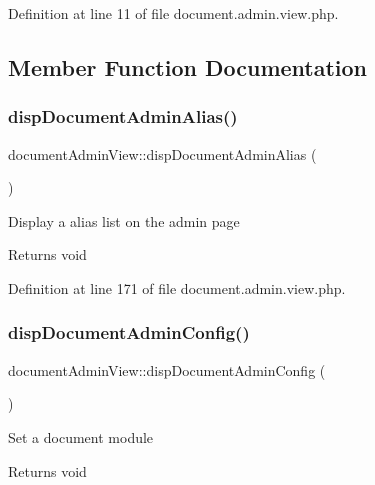 Definition at line 11 of file document.\+admin.\+view.\+php.



\subsection{Member Function Documentation}
\hypertarget{classdocumentAdminView_a7f9210670150395b7ef8c6209ce0ac53}{}\label{classdocumentAdminView_a7f9210670150395b7ef8c6209ce0ac53} 
\subsubsection{\texorpdfstring{disp\+Document\+Admin\+Alias()}{dispDocumentAdminAlias()}}
{\footnotesize\ttfamily document\+Admin\+View\+::disp\+Document\+Admin\+Alias (\begin{DoxyParamCaption}{ }\end{DoxyParamCaption})}

Display a alias list on the admin page \begin{DoxyReturn}{Returns}
void 
\end{DoxyReturn}


Definition at line 171 of file document.\+admin.\+view.\+php.

\hypertarget{classdocumentAdminView_a4b41049c99341fbb4a782da55d3737e5}{}\label{classdocumentAdminView_a4b41049c99341fbb4a782da55d3737e5} 
\subsubsection{\texorpdfstring{disp\+Document\+Admin\+Config()}{dispDocumentAdminConfig()}}
{\footnotesize\ttfamily document\+Admin\+View\+::disp\+Document\+Admin\+Config (\begin{DoxyParamCaption}{ }\end{DoxyParamCaption})}

Set a document module \begin{DoxyReturn}{Returns}
void 
\end{DoxyReturn}


